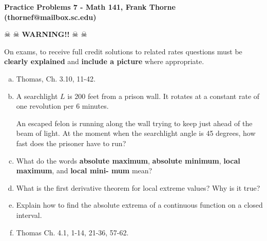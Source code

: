 \documentclass[12pt]{article}
\begin{document}
\setlength{\topmargin}{-2mm}





\begin{center}{\bf Practice Problems 7 - Math 141, Frank Thorne (thornef@mailbox.sc.edu)}

\medskip

\medskip

\medskip
$\skull$ $\skull$ {\bf WARNING!!} $\skull$ $\skull$
\end{center}
\vskip -0.1in
On exams, to receive full credit solutions to related rates questions must be {\bf clearly explained} and {\bf include a picture} where appropriate.

\begin{enumerate}[(a)]

\item
Thomas, Ch. 3.10, 11-42.

\item
A searchlight $L$ is 200 feet from a prison wall. It rotates at a constant rate of one revolution per 6 minutes.

An escaped felon is running along the wall trying to keep just ahead of the beam of light. At the
moment when the searchlight angle is 45 degrees, how fast does the prisoner have to run?

\item What do the words {\bf absolute maximum}, {\bf absolute minimum}, {\bf local maximum}, and {\bf local mini-
mum} mean?

\item What is the first derivative theorem for local extreme values? Why is it true?

\item Explain how to find the absolute extrema of a continuous function on a closed interval.

\item Thomas Ch. 4.1, 1-14, 21-36, 57-62.

\end{enumerate}
\end{document}

